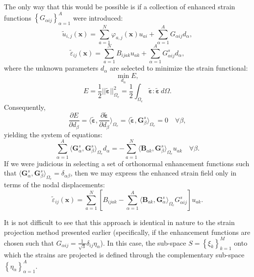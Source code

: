 \documentclass[12pt]{book}
\begin{document}
The only way that this would be possible is if a collection of enhanced strain functions $\left\{ G_{\alpha ij} \right\}_{\alpha = 1}^A$ were introduced:
\begin{equation}
  \tilde{u}_{i,j} (\mathbf{x}) = \sum_{a = 1}^N \varphi_{a,j} (\mathbf{x}) u_{ai} + \sum_{\alpha=1}^A G_{\alpha ij} d_{\alpha},
\end{equation}
\begin{equation}
  \tilde{\varepsilon}_{ij} (\mathbf{x}) = \sum_{a = 1}^N B_{ijak} u_{ak} + \sum_{\alpha=1}^A G^s_{\alpha ij} d_{\alpha},
\end{equation}
where the unknown parameters $d_{\alpha}$ are selected to minimize the strain functional:
\begin{equation}
  \min_{d_{\alpha}} E,
\end{equation}
\begin{equation}
  E = \frac{1}{2} || \tilde{\boldsymbol{\varepsilon}} ||^2_{\Omega_e} = \frac{1}{2} \int_{\Omega_e} \tilde{\boldsymbol{\varepsilon}} \colon \tilde{\boldsymbol{\varepsilon}} \, d \Omega.
\end{equation}
Consequently,
\begin{equation}
  \frac{\partial E}{\partial d_{\beta}} = \langle \tilde{\boldsymbol{\varepsilon}}, \frac{\partial \tilde{\boldsymbol{\varepsilon}}}{\partial d_{\beta}} \rangle_{\Omega_e} = \langle \tilde{\boldsymbol{\varepsilon}}, \mathbf{G}^s_{\beta} \rangle_{\Omega_e} = 0 \quad \forall \beta,
\end{equation}
yielding the system of equations:
\begin{equation}
  \sum_{\alpha=1}^A \langle \mathbf{G}^s_{\alpha}, \mathbf{G}^s_{\beta} \rangle_{\Omega_e} d_{\alpha} = - \sum_{a = 1}^N \langle \mathbf{B}_{ak}, \mathbf{G}^s_{\beta} \rangle_{\Omega_e} u_{ak} \quad \forall \beta.
\end{equation}
If we were judicious in selecting a set of orthonormal enhancement functions such that $\langle \mathbf{G}^s_{\alpha}, \mathbf{G}^s_{\beta} \rangle_{\Omega_e} = \delta_{\alpha \beta}$, then we may express the enhanced strain field only in terms of the nodal displacements:
\begin{equation}
  \tilde{\varepsilon}_{ij} (\mathbf{x}) = \sum_{a = 1}^N \left[ B_{ijak} - \sum_{\alpha=1}^A \langle \mathbf{B}_{ak}, \mathbf{G}^s_{\alpha} \rangle_{\Omega_e} G^s_{\alpha ij} \right] u_{ak}.
\end{equation}

It is not difficult to see that this approach is identical in nature to the strain projection method presented earlier (specifically, if the enhancement functions are chosen such that $G_{\alpha ij} = \frac{1}{\sqrt{3}} \delta_{ij} \eta_{\alpha}$). In this case, the sub-space $S = \left\{ \xi_k \right\}_{k=1}^M$ onto which the strains are projected is defined through the complementary sub-space $\left\{ \eta_{\alpha} \right\}_{\alpha = 1}^A$.
\end{document}
